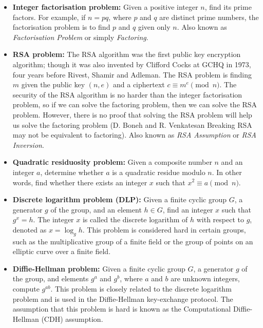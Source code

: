 \begin{itemize}
\item \textbf{Integer factorisation problem:} Given a positive integer $n$, find its prime factors. For example, if $n = pq$, where $p$ and $q$ are distinct prime numbers, the factorisation problem is to find $p$ and $q$ given only $n$. Also known as \textit{Factorisation Problem} or simply \textit{Factoring}.

\item \textbf{RSA problem:} The RSA algorithm was the first public key encryption algorithm; though it was also invented by Clifford Cocks at GCHQ in 1973, four years before Rivest, Shamir and Adleman. The RSA problem is finding $m$ given the public key $(n, e)$ and a ciphertext $c \equiv m^e \pmod{n}$. The security of the RSA algorithm is no harder than the integer factorisation problem, so if we can solve the factoring problem, then we can solve the RSA problem. However, there is no proof that solving the RSA problem will help us solve the factoring problem (D. Boneh and R. Venkatesan Breaking RSA may not be equivalent to factoring). Also known as \textit{RSA Assumption} or \textit{RSA Inversion}.

\item \textbf{Quadratic residuosity problem:} Given a composite number $n$ and an integer $a$, determine whether $a$ is a quadratic residue modulo $n$. In other words, find whether there exists an integer $x$ such that $x^2 \equiv a \pmod{n}$.

\item \textbf{Discrete logarithm problem (DLP):} Given a finite cyclic group $G$, a generator $g$ of the group, and an element $h \in G$, find an integer $x$ such that $g^x = h$. The integer $x$ is called the discrete logarithm of $h$ with respect to $g$, denoted as $x = \log_g h$. This problem is considered hard in certain groups, such as the multiplicative group of a finite field or the group of points on an elliptic curve over a finite field.

\item \textbf{Diffie-Hellman problem:} Given a finite cyclic group $G$, a generator $g$ of the group, and elements $g^a$ and $g^b$, where $a$ and $b$ are unknown integers, compute $g^{ab}$. This problem is closely related to the discrete logarithm problem and is used in the Diffie-Hellman key-exchange protocol. The assumption that this problem is hard is known as the Computational Diffie-Hellman (CDH) assumption.
\end{itemize}



